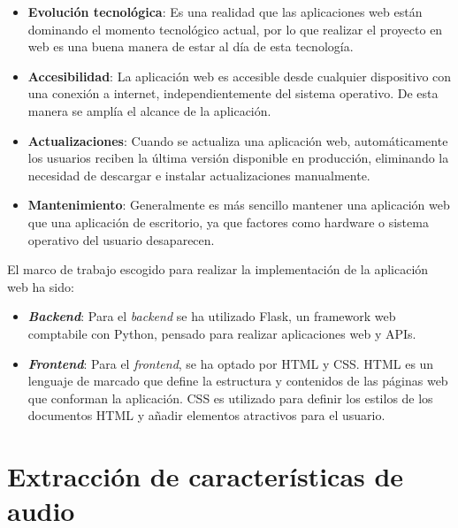 \begin{itemize}

\item \textbf{Evolución tecnológica}: Es una realidad que las aplicaciones web están dominando el momento tecnológico actual, por lo que realizar el proyecto en web es una buena manera de estar al día de esta tecnología.

\item \textbf{Accesibilidad}: La aplicación web es accesible desde cualquier dispositivo con una conexión a internet, independientemente del sistema operativo. De esta manera se amplía el alcance de la aplicación.

\item \textbf{Actualizaciones}: Cuando se actualiza una aplicación web, automáticamente los usuarios reciben la última versión disponible en producción, eliminando la necesidad de descargar e instalar actualizaciones manualmente. 

\item \textbf{Mantenimiento}: Generalmente es más sencillo mantener una aplicación web que una aplicación de escritorio, ya que factores como hardware o sistema operativo del usuario desaparecen.
\end{itemize}

El marco de trabajo escogido para realizar la implementación de la aplicación web ha sido:

\begin{itemize}

\item \textbf{\textit{Backend}}: Para el \textit{backend} se ha utilizado Flask, un framework web comptabile con Python, pensado para realizar aplicaciones web y APIs.

\item \textbf{\textit{Frontend}}: Para el \textit{frontend}, se ha optado por HTML y CSS. HTML es un lenguaje de marcado que define la estructura y contenidos de las páginas web que conforman la aplicación. CSS es utilizado para definir los estilos de los documentos HTML y añadir elementos atractivos para el usuario.

\end{itemize}

\newpage

\section{Extracción de características de audio}

